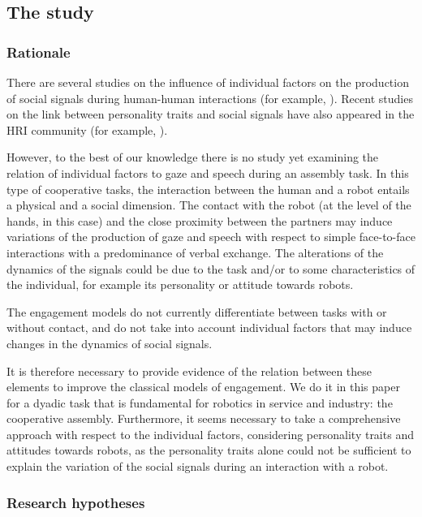 \subsection{The study}

\subsubsection{Rationale}

There are several studies on the influence of individual factors on the production of social signals during human-human interactions (for example, \cite{Lepri2010,Vinciarelli14}). 
Recent studies on the link between personality traits and social signals have also appeared in the HRI community (for example, \cite{Tapus08,Aly2013personality}). 

However, to the best of our knowledge there is no study yet examining the relation of individual factors to gaze and speech during an assembly task. 
In this type of cooperative tasks, the interaction between the human and a robot entails a physical and a social dimension. The contact with the robot (at the level of the hands, in this case) and the close proximity between the partners may induce variations of the production of gaze and speech with respect to simple face-to-face interactions with a predominance of verbal exchange. The alterations of the dynamics of the signals could be due to the task and/or to some characteristics of the individual, for example its personality or attitude towards robots.

The engagement models do not currently differentiate between tasks with or without contact, and do not take into account individual factors that may induce changes in the dynamics of social signals.

It is therefore necessary to provide evidence of the relation between these elements to improve the classical models of engagement. We do it in this paper for a dyadic task that is fundamental for robotics in service and industry: the cooperative assembly.
Furthermore, it seems necessary to take a comprehensive approach with respect to the individual factors, considering personality traits and attitudes towards robots, as the personality traits alone could not be sufficient to explain the variation of the social signals during an interaction with a robot.



\subsubsection{Research hypotheses}\label{sec:hypotheses}

